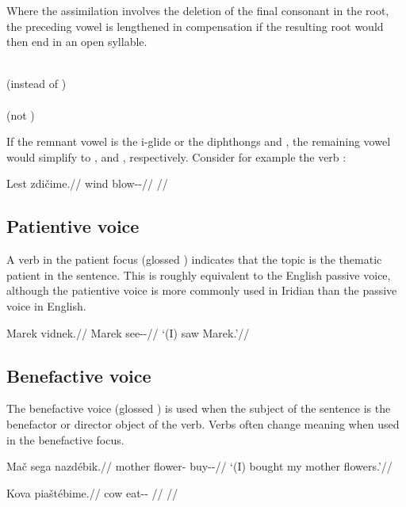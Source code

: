Where the assimilation involves the deletion of the final consonant in the root,
the preceding vowel is lengthened in compensation if the resulting root would
then end in an open syllable.
\begin{multicols}{2}
\pex
{}\\
(instead of )\\
\xe
\pex
{}\\
(not )\\
\xe
\end{multicols}

If the remnant vowel is the i-glide  or the diphthongs  and
, the remaining vowel would simplify to ,  and ,
respectively. Consider for example the verb  :

\pex
\begingl
\gla Lest zdičime.//
\glb wind blow-\Av{}-\Prog{}//
\glft {}//
\endgl
\xe

\subsection{Patientive voice}

A verb in the patient focus (glossed \Pv{}) indicates that the topic is the
thematic patient in the sentence. This is roughly equivalent to the English
passive voice, although the patientive voice is more commonly used in Iridian
than the passive voice in English. 

\pex
\begingl
\gla Marek vidnek.//
\glb Marek see-\Pv{}-\Pfv{}//
\glft `(I) saw Marek.'//
\endgl
\xe


\subsection{Benefactive voice}

The benefactive voice (glossed ) is used when the subject of the
sentence is the benefactor or director object of the verb. Verbs often change
meaning when used in the benefactive focus.


\begin{multicols}{2}
\pex
\begingl
\gla Mač sega nazdébik.//
\glb mother flower-\Acc{} buy-\Ben{}-\Pf{}//
\glft `(I) bought my mother flowers.'//
\endgl
\xe

\pex
\begingl
\gla Kova piaštébime.//
\glb cow eat-\Ben{}-\Prog{} //
\glft {}//
\endgl
\xe

\end{multicols}

